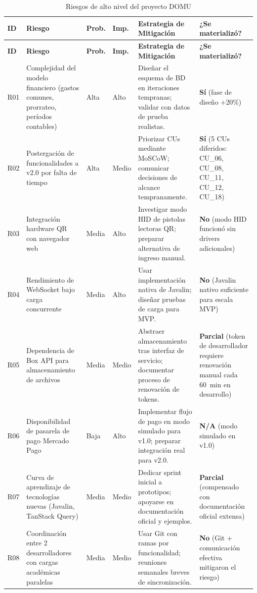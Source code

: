 \begin{longtable}{|p{}|p{}|p{}|p{}|p{}|p{}|}
\caption{Riesgos de alto nivel del proyecto DOMU}\label{tab:riesgos}\\
\hline
\textbf{ID} & \textbf{Riesgo} & \textbf{Prob.} & \textbf{Imp.} & \textbf{Estrategia de Mitigación} & \textbf{¿Se materializó?} \\
\hline
\endfirsthead
\hline
\textbf{ID} & \textbf{Riesgo} & \textbf{Prob.} & \textbf{Imp.} & \textbf{Estrategia de Mitigación} & \textbf{¿Se materializó?} \\
\hline
\endhead
\hline
\endfoot

R01 & Complejidad del modelo financiero (gastos comunes, prorrateo, períodos contables) & Alta & Alto & Diseñar el esquema de BD en iteraciones tempranas; validar con datos de prueba realistas. & \textbf{Sí} (fase de diseño +20\%) \\
\hline

R02 & Postergación de funcionalidades a v2.0 por falta de tiempo & Alta & Medio & Priorizar CUs mediante MoSCoW; comunicar decisiones de alcance tempranamente. & \textbf{Sí} (5 CUs diferidos: CU\_06, CU\_08, CU\_11, CU\_12, CU\_18) \\
\hline

R03 & Integración hardware QR con navegador web & Media & Alto & Investigar modo HID de pistolas lectoras QR; preparar alternativa de ingreso manual. & \textbf{No} (modo HID funcionó sin drivers adicionales) \\
\hline

R04 & Rendimiento de WebSocket bajo carga concurrente & Media & Alto & Usar implementación nativa de Javalin; diseñar pruebas de carga para MVP. & \textbf{No} (Javalin nativo suficiente para escala MVP) \\
\hline

R05 & Dependencia de Box API para almacenamiento de archivos & Media & Medio & Abstraer almacenamiento tras interfaz de servicio; documentar proceso de renovación de tokens. & \textbf{Parcial} (token de desarrollador requiere renovación manual cada 60~min en desarrollo) \\
\hline

R06 & Disponibilidad de pasarela de pago Mercado Pago & Baja & Alto & Implementar flujo de pago en modo simulado para v1.0; preparar integración real para v2.0. & \textbf{N/A} (modo simulado en v1.0) \\
\hline

R07 & Curva de aprendizaje de tecnologías nuevas (Javalin, TanStack Query) & Media & Medio & Dedicar sprint inicial a prototipos; apoyarse en documentación oficial y ejemplos. & \textbf{Parcial} (compensado con documentación oficial extensa) \\
\hline

R08 & Coordinación entre 2 desarrolladores con cargas académicas paralelas & Media & Medio & Usar Git con ramas por funcionalidad; reuniones semanales breves de sincronización. & \textbf{No} (Git + comunicación efectiva mitigaron el riesgo) \\

\end{longtable}

